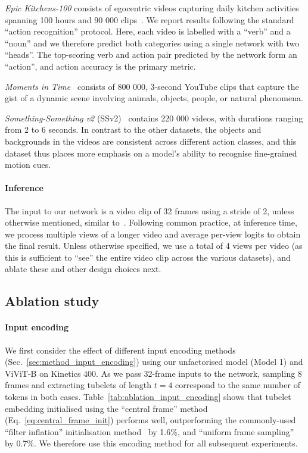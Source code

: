 \emph{Epic Kitchens-100} consists of egocentric videos capturing daily kitchen activities spanning 100 hours and 90 000 clips~\cite{damen_arxiv_2020}.
We report results following the standard ``action recognition'' protocol.
Here, each video is labelled with a ``verb'' and a ``noun'' and we therefore predict both categories using a single network with two ``heads''. The top-scoring verb and action pair predicted by the network form an ``action'', and action accuracy is the primary metric.

\emph{Moments in Time}~\cite{monfort_pami_2019} consists of 800 000,  3-second YouTube clips that capture the gist of a dynamic scene involving animals, objects, people, or natural phenomena. 

\emph{Something-Something v2} (SSv2)~\cite{goyal_iccv_2017} contains 220 000 videos, with durations ranging from 2 to 6 seconds.
In contrast to the other datasets, the objects and backgrounds in the videos are consistent across different action classes, and this dataset thus places more emphasis on a model's ability to recognise fine-grained motion cues.



\paragraph{Inference}
The input to our network is a video clip of 32 frames using a stride of 2, unless otherwise mentioned, similar to~\cite{feichtenhofer_iccv_2019, feichtenhofer_cvpr_2020}.
Following common practice, at inference time, we process multiple views of a longer video and average per-view logits to obtain the final result.
Unless otherwise specified, we use a total of 4 views per video (as this is sufficient to ``see'' the entire video clip across the various datasets), and ablate these and other design choices next.


\subsection{Ablation study}
\label{sec:exp_ablation}

\paragraph{Input encoding}
We first consider the effect of different input encoding methods (Sec.~\ref{sec:method_input_encoding}) using our unfactorised model (Model 1) and ViViT-B on Kinetics 400. 
As we pass 32-frame inputs to the network, sampling 8 frames and extracting tubelets of length $t = 4$ correspond to the same number of tokens in both cases.
Table~\ref{tab:ablation_input_encoding} shows that tubelet embedding initialised using the ``central frame'' method (Eq.~\ref{eq:central_frame_init}) performs well, outperforming the commonly-used ``filter inflation'' initialisation method~\cite{carreira_cvpr_2017, feichtenhofer_neurips_2016} by 1.6\%, and ``uniform frame sampling'' by 0.7\%.
We therefore use this encoding method for all subsequent experiments.



